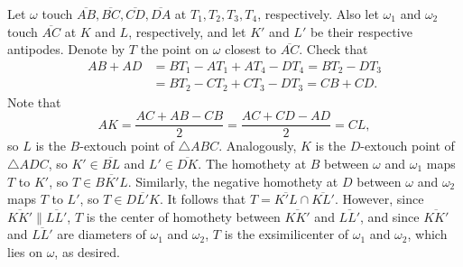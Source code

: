 Let $\omega$ touch $\overline{AB},\overline{BC},\overline{CD},\overline{DA}$ at $T_1,T_2,T_3,T_4$, respectively. Also let $\omega_1$ and $\omega_2$ touch $\overline{AC}$ at $K$ and $L$, respectively, and let $K'$ and $L'$ be their respective antipodes. Denote by $T$ the point on $\omega$ closest to $\overline{AC}$. Check that
\begin{align*}
    AB+AD&=BT_1-AT_1+AT_4-DT_4=BT_2-DT_3\\
    &=BT_2-CT_2+CT_3-DT_3=CB+CD.
\end{align*}
Note that \[AK=\frac{AC+AB-CB}2=\frac{AC+CD-AD}2=CL,\]
so $L$ is the $B$-extouch point of $\triangle ABC$. Analogously, $K$ is the $D$-extouch point of $\triangle ADC$, so $K'\in\overline{BL}$ and $L'\in\overline{DK}$. The homothety at $B$ between $\omega$ and $\omega_1$ maps $T$ to $K'$, so $T\in\overline{BK'L}$. Similarly, the negative homothety at $D$ between $\omega$ and $\omega_2$ maps $T$ to $L'$, so $T\in\overline{DL'K}$. It follows that $T=\overline{K'L}\cap\overline{KL'}$. However, since $\overline{KK'}\parallel\overline{LL'}$, $T$ is the center of homothety between $\overline{KK'}$ and $\overline{LL'}$, and since $\overline{KK'}$ and $\overline{LL'}$ are diameters of $\omega_1$ and $\omega_2$, $T$ is the exsimilicenter of $\omega_1$ and $\omega_2$, which lies on $\omega$, as desired.
